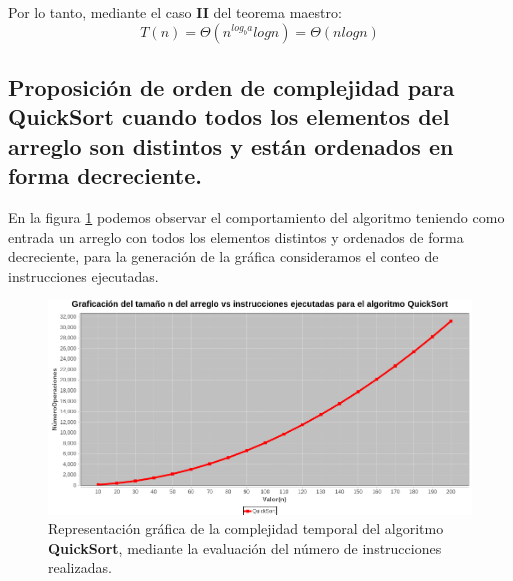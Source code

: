         Por lo tanto, mediante el caso \textbf{II} del teorema maestro:
        \begin{equation*}
            T(n) = \Theta (n^{log_ba}logn) = \Theta(nlogn)
        \end{equation*}
        
    \subsection*{Proposición de orden de complejidad para \textbf{QuickSort} cuando todos los elementos del arreglo son distintos y están ordenados en forma decreciente.}
        
        En la figura \ref{GraficaQSortOrdenados} podemos observar el comportamiento del algoritmo teniendo como entrada un arreglo con todos los elementos distintos y ordenados de forma decreciente, para la generación de la gráfica consideramos el conteo de instrucciones ejecutadas.
        
        \begin{figure}[h!]
            \centering
            \includegraphics[width=13cm]{QuickSort/graf-qsort-ordenados.png}
            \caption{Representación gráfica de la complejidad temporal del algoritmo \textbf{QuickSort}, mediante la evaluación del número de instrucciones realizadas.}
            \label{GraficaQSortOrdenados}
        \end{figure}
        
